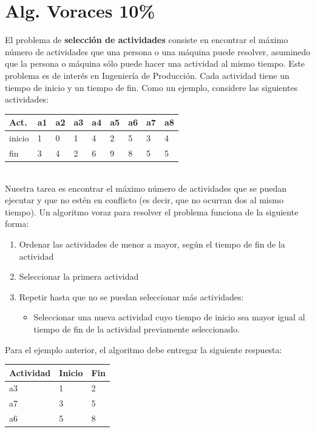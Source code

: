 \documentclass[twocolumn]{article}
\begin{document}
\section{Alg. Voraces 10\%}

El problema de \textbf{selección de actividades} consiste en encontrar el máximo número de actividades que una persona o una máquina puede resolver, asuminedo que la persona o máquina sólo puede hacer una actividad al mismo tiempo. Este problema es de interés en
Ingeniería de Producción. Cada actividad tiene un tiempo de inicio y un tiempo de fin. Como un ejemplo, considere las siguientes actividades:\\

\begin{tabular}{| l | l | l | l | l | l | l | l | l |}
\hline
Act. &	a1 &	a2 &	a3 &	a4 &	a5& 	a6& 	a7 &	a8\\
\hline
inicio &	1 &	0 &	1 &	4 &	2 &	5 &	3 &	4 \\
fin &	3 &	4 &	2 &	6 &	9 &	8 &	5 &	5 \\ 
\hline
\end{tabular}\\

Nuestra tarea es encontrar el máximo número de actividades que se puedan ejecutar y que no estén en conflicto (es decir, que no ocurran dos al mismo tiempo). 
Un algoritmo voraz para resolver el problema funciona de la siguiente forma: 

\begin{enumerate}
  \item Ordenar las actividades de menor a mayor, según el tiempo de fin de la actividad
  \item Seleccionar la primera actividad
  \item Repetir hasta que no se puedan seleccionar más actividades: 
  \begin{itemize}
    \item Seleccionar una nueva actividad cuyo tiempo de inicio sea mayor igual al tiempo de fin de la actividad previamente seleccionado.
  \end{itemize}
\end{enumerate}

Para el ejemplo anterior, el algoritmo debe entregar la siguiente
respuesta:\\

\begin{center}
\begin{tabular}{| l | l | l |}
\hline
  Actividad   &   Inicio   &  Fin\\
  \hline
        a3     &     1    &      2\\
        a7     &     3    &      5\\
        a6      &    5     &     8\\ 
        \hline
\end{tabular}\\
\end{center}
\end{document}

